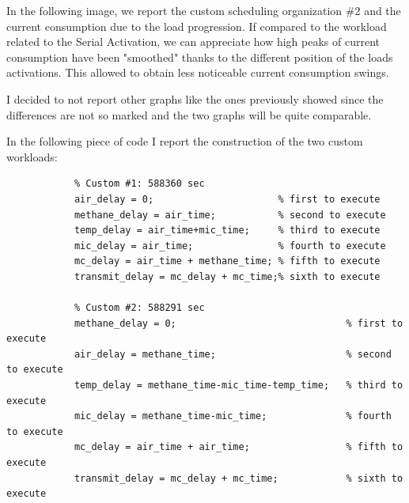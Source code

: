 \documentclass[a4paper]{article}
\begin{document}
        In the following image, we report the custom scheduling organization \#2 and the current consumption due to the load progression. If compared to the workload related to the Serial Activation, we can appreciate how high peaks of current consumption have been "smoothed" thanks to the different position of the loads activations. This allowed to obtain less noticeable current consumption swings.

        I decided to not report other graphs like the ones previously showed since the differences are not so marked and the two graphs will be quite comparable.

        \newpage

        In the following piece of code I report the construction of the two custom workloads:
        \begin{verbatim}
            % Custom #1: 588360 sec
            air_delay = 0;                      % first to execute
            methane_delay = air_time;           % second to execute
            temp_delay = air_time+mic_time;     % third to execute
            mic_delay = air_time;               % fourth to execute
            mc_delay = air_time + methane_time; % fifth to execute
            transmit_delay = mc_delay + mc_time;% sixth to execute
            
            % Custom #2: 588291 sec
            methane_delay = 0;                              % first to execute
            air_delay = methane_time;                       % second to execute
            temp_delay = methane_time-mic_time-temp_time;   % third to execute
            mic_delay = methane_time-mic_time;              % fourth to execute
            mc_delay = air_time + air_time;                 % fifth to execute
            transmit_delay = mc_delay + mc_time;            % sixth to execute
        \end{verbatim}
\end{document}

